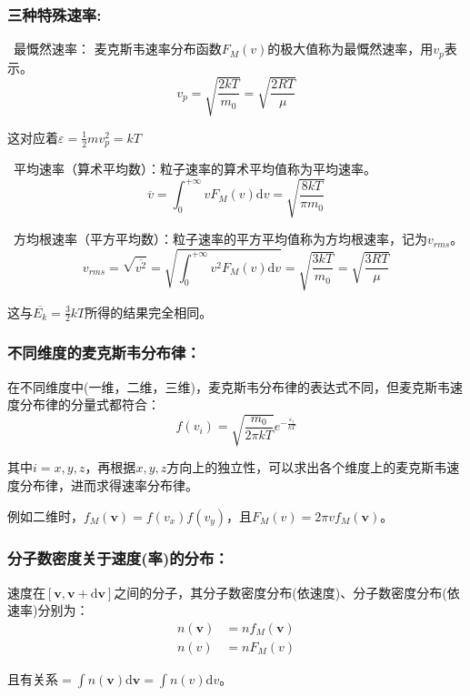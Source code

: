 \documentclass[zihao=-4,UTF8]{report}
\begin{document}
\subsubsection{三种特殊速率:}
\ 最慨然速率：
麦克斯韦速率分布函数$F_M(v)$的极大值称为最慨然速率，用$v_p$表示。
\begin{equation}
    v_p = \sqrt{\frac{2kT}{m_0}} = \sqrt{\frac{2RT}{\mu }}
\end{equation}\par
{\color{gray}\small 这对应着$\varepsilon = \frac{1}{2}mv_p^2 = kT$}\par
{}\ 平均速率（算术平均数）：粒子速率的算术平均值称为平均速率。
\begin{equation}
    \overline{v} = \int_{0}^{+\infty} vF_M(v)\mathrm{d}v = \sqrt{\frac{8kT}{\pi m_0}}
\end{equation}\par
{}\ 方均根速率（平方平均数）：粒子速率的平方平均值称为方均根速率，记为$v_{rms}$。
\begin{equation}
    v_{rms} = \sqrt{\overline{v^2}} =  \sqrt{\int_{0}^{+\infty} v^2F_M(v)\mathrm{d}v} = \sqrt{ \frac{3kT}{m_0}} = \sqrt{ \frac{3RT}{\mu }}
\end{equation}\par    
{\color{gray}\small 这与$\overline{E_k} = \frac{3}{2}kT$所得的结果完全相同。}
\subsubsection{不同维度的麦克斯韦分布律：}
在不同维度中(一维，二维，三维)，麦克斯韦分布律的表达式不同，但麦克斯韦速度分布律的分量式都符合：
\begin{equation}
    f(v_i) = \sqrt{\frac{m_0}{2\pi kT}}e^{-\frac{\varepsilon_{i}}{kT}}
\end{equation}\par
其中$i = x,y,z$，再根据$x,y,z$方向上的独立性，可以求出各个维度上的麦克斯韦速度分布律，进而求得速率分布律。\par
{\color{gray}\small 例如二维时，$f_M(\boldsymbol{v}) = f(v_x)f(v_y)$，且$F_M(v) = 2\pi vf_M(\boldsymbol{v})$。} 

\subsubsection{分子数密度关于速度(率)的分布：}
速度在$[\boldsymbol{v},\boldsymbol{v}+\mathrm{d}\boldsymbol{v}]$之间的分子，其分子数密度分布(依速度)、分子数密度分布(依速率)分别为：
\begin{align}
    n(\boldsymbol{v}) &= n f_M(\boldsymbol{v})\\
    n(v)& = n F_M(v)
\end{align}\par
且有关系$ = \int n(\boldsymbol{v})\mathrm{d}\boldsymbol{v} = \int n(v)\mathrm{d}v$。
\end{document}
